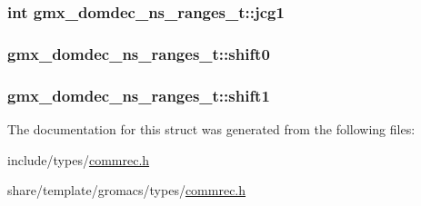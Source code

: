 \hypertarget{structgmx__domdec__ns__ranges__t_a0856f11fc2acbc2a1bdb0590dae459f7}{
\subsubsection[{jcg1}]{\setlength{\rightskip}{0pt plus 5cm}int {\bf gmx\-\_\-domdec\-\_\-ns\-\_\-ranges\-\_\-t\-::jcg1}}}\label{structgmx__domdec__ns__ranges__t_a0856f11fc2acbc2a1bdb0590dae459f7}
\hypertarget{structgmx__domdec__ns__ranges__t_a637687ab45958a2d82b43731aaa29b32}{
\subsubsection[{shift0}]{ {\bf gmx\-\_\-domdec\-\_\-ns\-\_\-ranges\-\_\-t\-::shift0}}}\label{structgmx__domdec__ns__ranges__t_a637687ab45958a2d82b43731aaa29b32}
\hypertarget{structgmx__domdec__ns__ranges__t_af01050b694d84e0ee9ed11ea7971f876}{
\subsubsection[{shift1}]{ {\bf gmx\-\_\-domdec\-\_\-ns\-\_\-ranges\-\_\-t\-::shift1}}}\label{structgmx__domdec__ns__ranges__t_af01050b694d84e0ee9ed11ea7971f876}


\-The documentation for this struct was generated from the following files\-:\begin{DoxyCompactItemize}
\item 
include/types/\hyperlink{include_2types_2commrec_8h}{commrec.\-h}\item 
share/template/gromacs/types/\hyperlink{share_2template_2gromacs_2types_2commrec_8h}{commrec.\-h}\end{DoxyCompactItemize}
